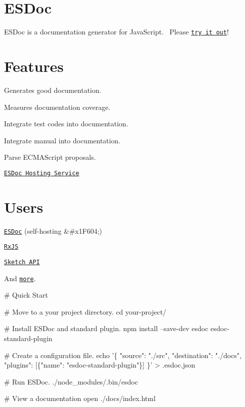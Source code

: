 \href{https://travis-ci.org/esdoc/esdoc}{\tt } \href{https://codecov.io/gh/esdoc/esdoc}{\tt } \href{https://doc.esdoc.org/github.com/esdoc/esdoc}{\tt }

\section*{E\+S\+Doc}

E\+S\+Doc is a documentation generator for Java\+Script.~\newline
 Please \href{https://try.esdoc.org}{\tt try it out}!



\section*{Features}


\begin{DoxyItemize}
\item Generates good documentation.
\item Measures documentation coverage.
\item Integrate test codes into documentation.
\item Integrate manual into documentation.
\item Parse E\+C\+M\+A\+Script proposals.
\item \href{https://doc.esdoc.org}{\tt E\+S\+Doc Hosting Service}
\end{DoxyItemize}

\section*{Users}


\begin{DoxyItemize}
\item \href{https://doc.esdoc.org/github.com/esdoc/esdoc/}{\tt E\+S\+Doc} (self-\/hosting \&\#x1\+F604;)
\item \href{http://reactivex.io/rxjs/}{\tt Rx\+JS}
\item \href{http://developer.sketchapp.com/reference/api/}{\tt Sketch A\+PI}
\end{DoxyItemize}

And \href{https://github.com/search?o=desc&q=esdoc+filename%3Apackage.json+-user%3Ah13i32maru+-user%3Aesdoc+-user%3Aes-doc&ref=searchresults&s=indexed&type=Code&utf8=%E2%9C%93}{\tt more}.

\# Quick Start 
\begin{DoxyCode}
# Move to a your project directory.
cd your-project/

# Install ESDoc and standard plugin.
npm install --save-dev esdoc esdoc-standard-plugin

# Create a configuration file.
echo '\{
  "source": "./src",
  "destination": "./docs",
  "plugins": [\{"name": "esdoc-standard-plugin"\}]
\}' > .esdoc.json

# Run ESDoc.
./node\_modules/.bin/esdoc

# View a documentation
open ./docs/index.html
\end{DoxyCode}


